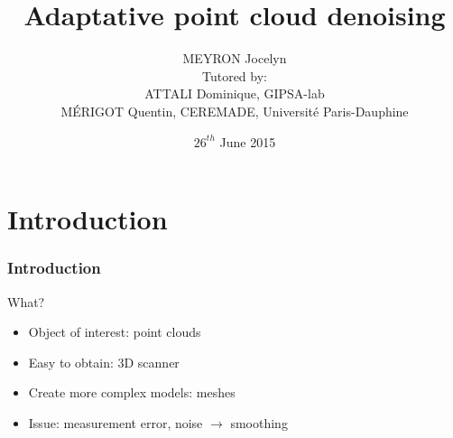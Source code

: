 \documentclass{beamer}
\title[Adaptative point cloud denoising]{Adaptative point cloud denoising}
\author[MEYRON Jocelyn]{MEYRON Jocelyn\\\scriptsize{Tutored by:\\
        ATTALI Dominique, GIPSA-lab\\
        MÉRIGOT Quentin, CEREMADE, Université Paris-Dauphine}}
\institute{GIPSA-lab}
\date{$ 26^{th} $ June 2015}
\begin{document}
\begin{frame}
    \titlepage
\end{frame}

\begin{frame}
    \tableofcontents
\end{frame}

\section{Introduction}

\begin{frame}[allowframebreaks]
    \frametitle{Introduction}

    What?
    \begin{itemize}
        \item Object of interest: point clouds
        \item Easy to obtain: 3D scanner
        \item Create more complex models: meshes
        \item Issue: measurement error, noise $ \to $ smoothing
    \end{itemize}


\end{frame}
\end{document}

